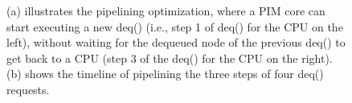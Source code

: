 \begin{figure}[ht!]
\centering
{}

\caption{(a) illustrates the pipelining optimization, where a PIM core can start executing a new 
deq() (i.e., step 1 of deq() for the CPU on the left), without waiting for the dequeued node of the previous deq() 
to get back to a CPU (step 3 of the deq() for the CPU on the right). 
(b) shows the timeline of pipelining the three steps of four deq() requests.}
\label{figure:queue_pipeline}
\end{figure}

